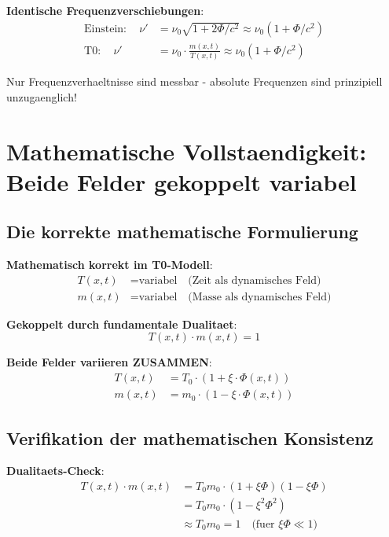 \documentclass[12pt,a4paper]{article}
\newcommand{\xipar}{\xi}
\theoremstyle{definition}
\theoremstyle{remark}
\begin{document}
	\textbf{Identische Frequenzverschiebungen}:
	\begin{align}
		\text{Einstein}: \quad \nu' &= \nu_0 \sqrt{1 + 2\Phi/c^2} \approx \nu_0 (1 + \Phi/c^2) \\
		\text{T0}: \quad \nu' &= \nu_0 \cdot \frac{m(x,t)}{T(x,t)} \approx \nu_0 (1 + \Phi/c^2)
	\end{align}
	
	Nur Frequenzverhaeltnisse sind messbar - absolute Frequenzen sind prinzipiell unzugaenglich!
	
	\section{Mathematische Vollstaendigkeit: Beide Felder gekoppelt variabel}
	
	\subsection{Die korrekte mathematische Formulierung}
	
	\textbf{Mathematisch korrekt im T0-Modell}:
	\begin{align}
		T(x,t) &= \text{variabel} \quad \text{(Zeit als dynamisches Feld)} \\
		m(x,t) &= \text{variabel} \quad \text{(Masse als dynamisches Feld)}
	\end{align}
	
	\textbf{Gekoppelt durch fundamentale Dualitaet}:
	\begin{equation}
		T(x,t) \cdot m(x,t) = 1
	\end{equation}
	
	\textbf{Beide Felder variieren ZUSAMMEN}:
	\begin{align}
		T(x,t) &= T_0 \cdot (1 + \xipar \cdot \Phi(x,t)) \\
		m(x,t) &= m_0 \cdot (1 - \xipar \cdot \Phi(x,t))
	\end{align}
	
	\subsection{Verifikation der mathematischen Konsistenz}
	
	\textbf{Dualitaets-Check}:
	\begin{align}
		T(x,t) \cdot m(x,t) &= T_0 m_0 \cdot (1 + \xipar \Phi)(1 - \xipar \Phi) \\
		&= T_0 m_0 \cdot (1 - \xipar^2 \Phi^2) \\
		&\approx T_0 m_0 = 1 \quad \text{(fuer } \xipar \Phi \ll 1\text{)}
	\end{align}
	
\end{document}
